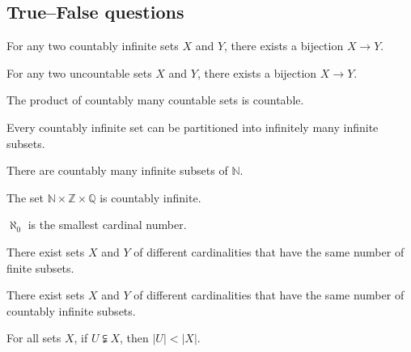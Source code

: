 \subsection*{True--False questions}


\begin{chapex} %
\label{cqInfinityTFBegin}
For any two countably infinite sets $X$ and $Y$, there exists a bijection $X \to Y$.
\end{chapex}

\begin{chapex} %
For any two uncountable sets $X$ and $Y$, there exists a bijection $X \to Y$.
\end{chapex}

\begin{chapex} %
The product of countably many countable sets is countable.
\end{chapex}

\begin{chapex} %
Every countably infinite set can be partitioned into infinitely many infinite subsets.
\end{chapex}

\begin{chapex} %
There are countably many infinite subsets of $\mathbb{N}$.
\end{chapex}

\begin{chapex} %
The set $\mathbb{N} \times \mathbb{Z} \times \mathbb{Q}$ is countably infinite.
\end{chapex}

\begin{chapex} %
$\aleph_0$ is the smallest cardinal number.
\end{chapex}

\begin{chapex} %
There exist sets $X$ and $Y$ of different cardinalities that have the same number of finite subsets.
\end{chapex}

\begin{chapex} %
There exist sets $X$ and $Y$ of different cardinalities that have the same number of countably infinite subsets.
\end{chapex}

\begin{chapex} %
For all sets $X$, if $U \subsetneqq X$, then $|U| < |X|$.
\end{chapex}

